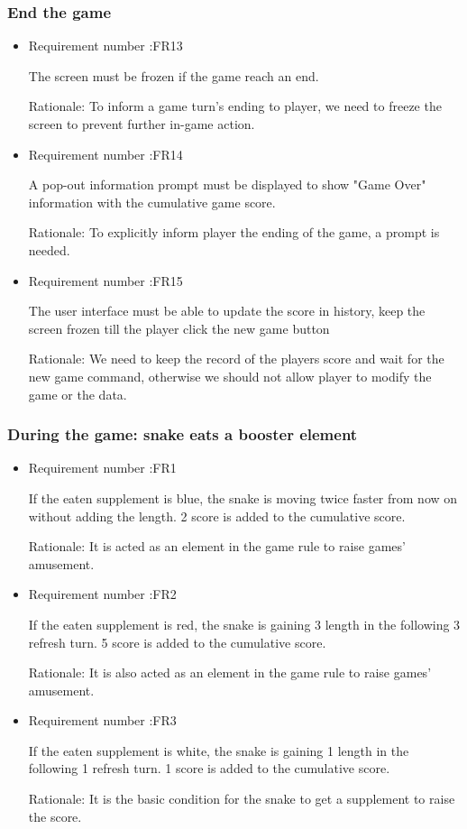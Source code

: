 \documentclass[12pt, titlepage]{article}
\begin{document}
\subsubsection{End the game}
\begin{itemize}
		\item Requirement number :FR13  
		
		The screen must be frozen if the game reach an end. 
		 
		Rationale: To inform a game turn's ending to player, we need to freeze the screen to prevent further in-game action.
		\item Requirement number :FR14  
		
		A pop-out information prompt must be displayed to show "Game Over" information with the cumulative game score.
		 
		Rationale: To explicitly inform player the ending of the game, a prompt is needed.
		\item Requirement number :FR15  
		
		The user interface must be able to update the score in history, keep the screen frozen till the player click the new game button
		 
		Rationale: We need to keep the record of the players score and wait for the new game command, otherwise we should not allow player to modify the game or the data.
	\end{itemize}

\subsubsection{During the game: snake eats a booster element}
\begin{itemize}
		\item Requirement number :FR1  
		
		If the eaten supplement is blue, the snake is moving twice faster from now on without adding the length. 2 score is added to the cumulative score.
		 
		Rationale: It is acted as an element in the game rule to raise games' amusement.
		\item Requirement number :FR2  
		
		If the eaten supplement is red, the snake is gaining 3 length in the following 3 refresh turn. 5 score is added to the cumulative score.
		 
		Rationale: It is also acted as an element in the game rule to raise games' amusement.
		\item Requirement number :FR3   
		
    	If the eaten supplement is white, the snake is gaining 1 length in the following 1 refresh turn. 1 score is added to the cumulative score.
		
		Rationale: It is the basic condition for the snake to get a supplement to raise the score.  
		
	\end{itemize}
\end{document}
